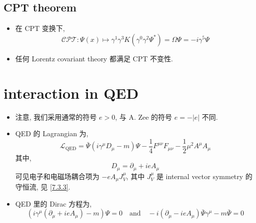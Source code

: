 \subsection{CPT theorem}
\begin{itemize}
	\item 在 CPT 变换下,
	\begin{equation}
		\mathcal{CPT} : \Psi(x) \mapsto \gamma^1 \gamma^3 K (\gamma^0 \gamma^2 \Psi^*) = \Omega \Psi = - i \gamma^5 \Psi
	\end{equation}
	
	\item 任何 Lorentz covariant theory 都满足 CPT 不变性.
\end{itemize}

\section{interaction in QED}
\begin{itemize}
	\item 注意, 我们采用通常的符号 $e > 0$, 与 A. Zee 的符号 $e = - |e|$ 不同.
	
	\item QED 的 Lagrangian 为,
	\begin{equation}
		\mathcal{L}_\text{QED} = \bar{\Psi} (i \gamma^\mu D_\mu - m) \Psi - \frac{1}{4} F^{\mu \nu} F_{\mu \nu} - \frac{1}{2} \mu^2 A^\mu A_\mu
	\end{equation}
	其中,
	\begin{equation}
		D_\mu = \partial_\mu + i e A_\mu
	\end{equation}
	可见电子和电磁场耦合项为 $- e A_\mu J_V^\mu$, 其中 $J_V^\mu$ 是 internal vector symmetry 的守恒流, 见 \eqref{7.3.3}.
	
	\item QED 里的 Dirac 方程为,
	\begin{equation}
		(i \gamma^\mu (\partial_\mu + i e A_\mu) - m) \Psi = 0 \quad \text{and} \quad - i (\partial_\mu - i e A_\mu) \bar{\Psi} \gamma^\mu - m \bar{\Psi} = 0
	\end{equation}
\end{itemize}

